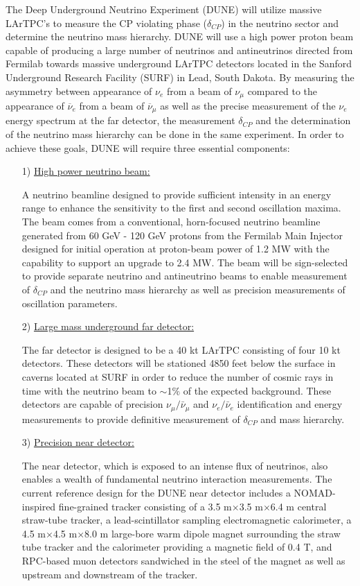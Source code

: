 The Deep Underground Neutrino Experiment (DUNE) \cite{DUNE} will utilize massive LArTPC's to measure the CP violating phase ($\delta_{CP}$) in the neutrino sector and determine the neutrino mass hierarchy. DUNE will use a high power proton beam capable of producing a large number of neutrinos and antineutrinos directed from Fermilab towards massive underground LArTPC detectors located in the Sanford Underground Research Facility (SURF) in Lead, South Dakota. By measuring the asymmetry between appearance of $\nu_{e}$ from a beam of $\nu_{\mu}$ compared to the appearance of $\overline{\nu}_{e}$ from a beam of $\overline{\nu}_{\mu}$ as well as the precise measurement of the $\nu_{e}$ energy spectrum at the far detector, the measurement $\delta_{CP}$ and the determination of the neutrino mass hierarchy can be done in the same experiment. In order to achieve these goals, DUNE will require three essential components:
\begin{itemize}
\item[1)] \underline{High power neutrino beam:}

A neutrino beamline designed to provide sufficient intensity in an energy range to enhance the sensitivity to the first and second oscillation maxima. The beam comes from a conventional, horn-focused neutrino beamline generated from 60 GeV - 120 GeV protons from the Fermilab Main Injector designed for initial operation at proton-beam power of 1.2 MW with the capability to support an upgrade to 2.4 MW. The beam will be sign-selected to provide separate neutrino and antineutrino beams to enable measurement of $\delta_{CP}$ and the neutrino mass hierarchy as well as precision measurements of oscillation parameters.

\item[2)] \underline{Large mass underground far detector:}

The far detector is designed to be a 40 kt LArTPC consisting of four 10 kt detectors. These detectors will be stationed 4850 feet below the surface in caverns located at SURF in order to reduce the number of cosmic rays in time with the neutrino beam to $\sim$1$\%$ of the expected background. These detectors are capable of precision ${\nu}_{\mu} / \bar{\nu}_{\mu}$ and ${\nu}_{e} / \bar{\nu}_{e}$ identification and energy measurements to provide definitive measurement of $\delta_{CP}$ and mass hierarchy.

\item[3)] \underline{Precision near detector:}

The near detector, which is exposed to an intense flux of neutrinos, also enables a wealth of fundamental neutrino interaction measurements. The current reference design for the DUNE near detector includes a NOMAD-inspired \cite{nomad} fine-grained tracker consisting of a 3.5 m$\times$3.5 m$\times$6.4 m central straw-tube tracker, a lead-scintillator sampling electromagnetic calorimeter, a 4.5 m$\times$4.5 m$\times$8.0 m large-bore warm dipole magnet surrounding the straw tube tracker and the calorimeter providing a magnetic field of 0.4 T, and RPC-based muon detectors sandwiched in the steel of the magnet as well as upstream and downstream of the tracker.

\end{itemize}

